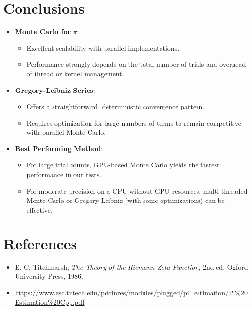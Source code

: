 \documentclass[12pt]{article}
\begin{document}
\section{Conclusions}
\begin{itemize}
    \item \textbf{Monte Carlo for \(\pi\)}:
          \begin{itemize}
              \item Excellent scalability with parallel implementations.
              \item Performance strongly depends on the total number of trials and overhead of
                    thread or kernel management.
          \end{itemize}
    \item \textbf{Gregory-Leibniz Series}:
          \begin{itemize}
              \item Offers a straightforward, deterministic convergence pattern.
              \item Requires optimization for large numbers of terms to remain competitive with
                    parallel Monte Carlo.
          \end{itemize}
    \item \textbf{Best Performing Method}:
          \begin{itemize}
              \item For large trial counts, GPU-based Monte Carlo yields the fastest performance in
                    our tests.
              \item For moderate precision on a CPU without GPU resources, multi-threaded Monte
                    Carlo or Gregory-Leibniz (with some optimizations) can be effective.
          \end{itemize}
\end{itemize}

\section*{References}
\begin{itemize}
    \item E. C. Titchmarsh, \emph{The Theory of the Riemann Zeta-Function}, 2nd ed.
          Oxford University Press, 1986.
    \item \url{https://www.esc.tntech.edu/pdcinres/modules/plugged/pi_estimation/Pi%20Estimation%20Cpp.pdf}
\end{itemize}
\end{document}

